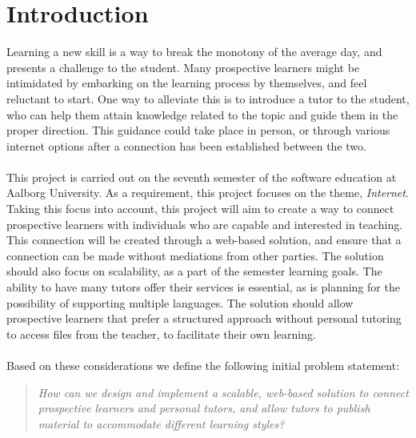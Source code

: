 \chapter{Introduction}\label{chap:introduction}
Learning a new skill is a way to break the monotony of the average day, and presents a challenge to the student.
Many prospective learners might be intimidated by embarking on the learning process by themselves, and feel reluctant to start.
One way to alleviate this is to introduce a tutor to the student, who can help them attain knowledge related to the topic and guide them in the proper direction.
This guidance could take place in person, or through various internet options after a connection has been established between the two.
\\\\
This project is carried out on the seventh semester of the software education at Aalborg University. 
As a requirement, this project focuses on the theme, \textit{Internet}.
Taking this focus into account, this project will aim to create a way to connect prospective learners with individuals who are capable and interested in teaching.
This connection will be created through a web-based solution, and ensure that a connection can be made without mediations from other parties.
The solution should also focus on scalability, as a part of the semester learning goals.
The ability to have many tutors offer their services is essential, as is planning for the possibility of supporting multiple languages.
The solution should allow prospective learners that prefer a structured approach without personal tutoring to access files from the teacher, to facilitate their own learning.
\\\\
Based on these considerations we define the following initial problem statement:
\begin{quote}
    \textit{How can we design and implement a scalable, web-based solution to connect prospective learners and personal tutors, and allow tutors to publish material to accommodate different learning styles?}
\end{quote}
